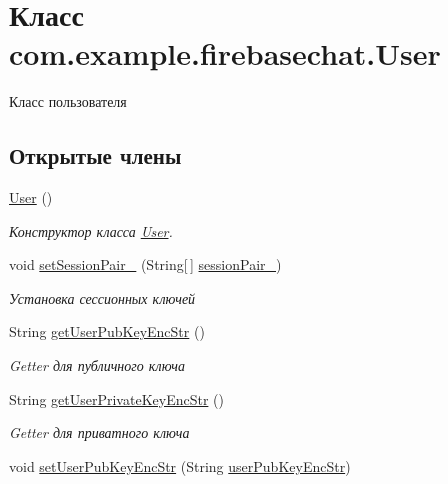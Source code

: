 \hypertarget{classcom_1_1example_1_1firebasechat_1_1_user}{}\section{Класс com.\+example.\+firebasechat.\+User}
\label{classcom_1_1example_1_1firebasechat_1_1_user}


Класс пользователя  


\subsection*{Открытые члены}
\begin{DoxyCompactItemize}
\item 
\mbox{\hyperlink{classcom_1_1example_1_1firebasechat_1_1_user_adc3b037f7e367a6aa8aaac01360d5340}{User}} ()
\begin{DoxyCompactList}\small\item\em Конструктор класса \mbox{\hyperlink{classcom_1_1example_1_1firebasechat_1_1_user}{User}}. \end{DoxyCompactList}\item 
void \mbox{\hyperlink{classcom_1_1example_1_1firebasechat_1_1_user_aa46d2b146ffd91c6b9cf36ec5e194b1f}{set\+Session\+Pair\+\_\+}} (String\mbox{[}$\,$\mbox{]} \mbox{\hyperlink{classcom_1_1example_1_1firebasechat_1_1_user_a2e442876539909f5f9725196556d5fa7}{session\+Pair\+\_\+}})
\begin{DoxyCompactList}\small\item\em Установка сессионных ключей \end{DoxyCompactList}\item 
String \mbox{\hyperlink{classcom_1_1example_1_1firebasechat_1_1_user_af9252d4d96f56d8a74611553307df0a8}{get\+User\+Pub\+Key\+Enc\+Str}} ()
\begin{DoxyCompactList}\small\item\em Getter для публичного ключа \end{DoxyCompactList}\item 
String \mbox{\hyperlink{classcom_1_1example_1_1firebasechat_1_1_user_a6dc80a46d2e49d8c03299dc5b7b15727}{get\+User\+Private\+Key\+Enc\+Str}} ()
\begin{DoxyCompactList}\small\item\em Getter для приватного ключа \end{DoxyCompactList}\item 
void \mbox{\hyperlink{classcom_1_1example_1_1firebasechat_1_1_user_aecc22b4b773ae3ba00ad0c7ed4db4340}{set\+User\+Pub\+Key\+Enc\+Str}} (String \mbox{\hyperlink{classcom_1_1example_1_1firebasechat_1_1_user_a92f14106f35b17ca627b7a5ca0dd3d02}{user\+Pub\+Key\+Enc\+Str}})

\end{DoxyCompactItemize}
